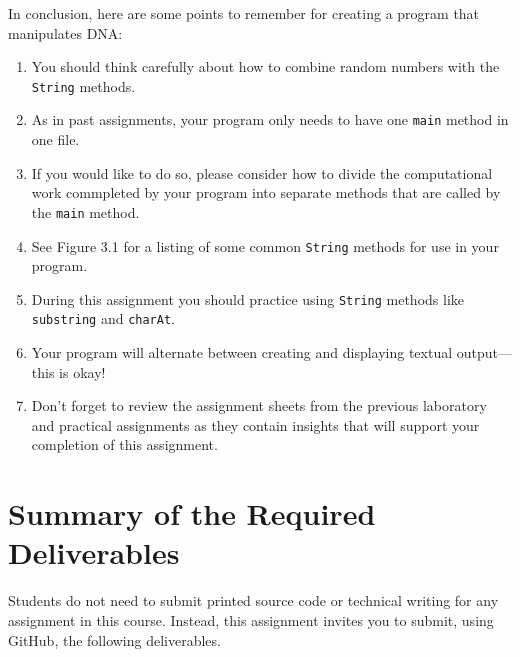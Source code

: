 \documentclass[11pt]{article}
\newcommand{\program}[1]{\lstinline{#1}}
\begin{document}
In conclusion, here are some points to remember for creating a program that
manipulates DNA:

\begin{enumerate}
  \setlength{\itemsep}{2pt}

\item You should think carefully about how to combine random numbers with the
  {\tt String} methods.

\item As in past assignments, your program only needs to have one {\tt main}
  method in one file.

\item If you would like to do so, please consider how to divide the
  computational work commpleted by your program into separate methods that are
  called by the \program{main} method.

\item See Figure 3.1 for a listing of some common \program{String} methods for
  use in your program.

\item During this assignment you should practice using \program{String} methods
  like \program{substring} and \program{charAt}.

\item Your program will alternate between creating and displaying textual
  output---this is okay!

\item Don't forget to review the assignment sheets from the previous laboratory
  and practical assignments as they contain insights that will support your
  completion of this assignment.

\end{enumerate}

\section*{Summary of the Required Deliverables}

\noindent Students do not need to submit printed source code or technical
writing for any assignment in this course. Instead, this assignment invites you
to submit, using GitHub, the following deliverables.
\end{document}
